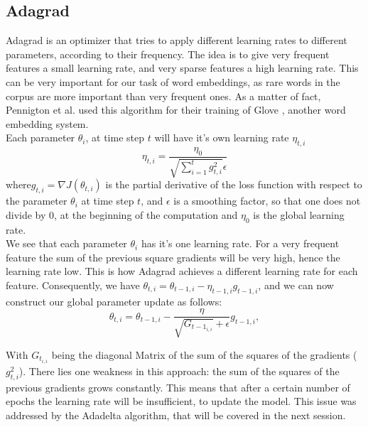 \subsection{Adagrad}\label{ssec:adagrad}
Adagrad \cite{adagrad} is an optimizer that tries to apply different learning rates to different parameters, according to their frequency. The idea is to give very frequent features a small learning rate, and very sparse features a high learning rate. This can be very important for our task of word embeddings, as rare words in the corpus are more important than very frequent ones. As a matter of fact, Pennigton et al. used this algorithm for their training of Glove \cite{glove}, another word embedding system. \\
Each parameter $\theta_i$, at time step $t$ will have it's own learning rate $\eta_{t,i}$
\begin{equation}
\eta_{t,i} = \frac{\eta_0}{\sqrt{\sum^{t}_{i=1} g^{2}_{t,i}} \epsilon}
\end{equation}
where$g_{t,i} = \nabla J(\theta_{t,i})$ is the partial derivative of the loss function with respect to the parameter $\theta_i$ at time step $t$, and $\epsilon$ is a smoothing factor, so that one does not divide by $0$, at the beginning of the computation and $\eta_0$ is the global learning rate.\\ We see that each parameter $\theta_{i}$ has it's one learning rate. For a very frequent feature the sum of the previous square gradients will be very high, hence the learning rate low. This is how Adagrad achieves a different learning rate for each feature.
Consequently, we have $ \theta_{t,i} = \theta_{t-1,i} - \eta_{t-1,i} g_{t-1,i} $, and we can now construct our global parameter update as follows:
\begin{equation}
\theta_{t,i} = \theta_{t-1,i}- \frac{\eta}{\sqrt{G_{{t-1}_{i,i}}} + \epsilon} g_{t-1,i},
\end{equation}

With $G_{t_{i,i}}$ being the diagonal Matrix of the sum of the squares of the gradients ($g_{t,i}^2 $).
There lies one weakness in this approach: the sum of the squares of the previous gradients grows constantly. This means that after a certain number of epochs the learning rate will be insufficient, to update the model. This issue was addressed by the Adadelta algorithm, that will be covered in the next session.

